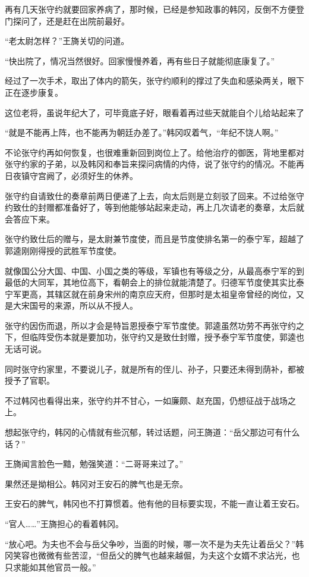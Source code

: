 再有几天张守约就要回家养病了，那时候，已经是参知政事的韩冈，反倒不方便登门探问了，还是赶在出院前最好。

“老太尉怎样？”王旖关切的问道。

“快出院了，情况当然很好。回家慢慢养着，再有些日子就能彻底康复了。”

经过了一次手术，取出了体内的箭矢，张守约顺利的撑过了失血和感染两关，眼下正在逐步康复。

这位老将，虽说年纪大了，可毕竟底子好，眼看着再过些天就能自个儿给站起来了

“就是不能再上阵，也不能再为朝廷办差了。”韩冈叹着气，“年纪不饶人啊。”

不论张守约再如何恢复，也很难重新回到岗位上了。给他治疗的御医，背地里都对张守约家的子弟，以及韩冈和奉旨来探问病情的内侍，说了张守约的情况。不能再日夜镇守宫阙了，必须好生的休养。

张守约自请致仕的奏章前两日便递了上去，向太后则是立刻驳了回来。不过给张守约致仕的封赠都准备好了，等到他能够站起来走动，再上几次请老的奏章，太后就会答应下来。

张守约致仕后的赠与，是太尉兼节度使，而且是节度使排名第一的泰宁军，超越了郭逵刚刚得授的武胜军节度使。

就像国公分大国、中国、小国之类的等级，军镇也有等级之分，从最高泰宁军的到最低的大同军，其地位高下，看朝会上的排位就能清楚了。归德军节度使其实比泰宁军更高，其辖区就在前身宋州的南京应天府，但那时是太祖皇帝曾经的岗位，又是大宋国号的来源，所以从不授人。

张守约因伤而退，所以才会是特旨恩授泰宁军节度使。郭逵虽然功劳不再张守约之下，但临阵受伤本就是要加功，张守约又是致仕封赠，授予泰宁军节度使，郭逵也无话可说。

同时张守约家里，不要说儿子，就是所有的侄儿、孙子，只要还未得到荫补，都被授予了官职。

不过韩冈也看得出来，张守约并不甘心，一如廉颇、赵充国，仍想征战于战场之上。

想起张守约，韩冈的心情就有些沉郁，转过话题，问王旖道：“岳父那边可有什么话？”

王旖闻言脸色一黯，勉强笑道：“二哥哥来过了。”

果然还是拗相公。韩冈对王安石的脾气也是无奈。

王安石的脾气，韩冈也不打算惯着。他有他的目标要实现，不能一直让着王安石。

“官人……”王旖担心的看着韩冈。

“放心吧。为夫也不会与岳父争吵，当面的时候，哪一次不是为夫先让着岳父？”韩冈笑容也微微有些苦涩，“但岳父的脾气也越来越倔，为夫这个女婿不求沾光，也只求能如其他官员一般。”

